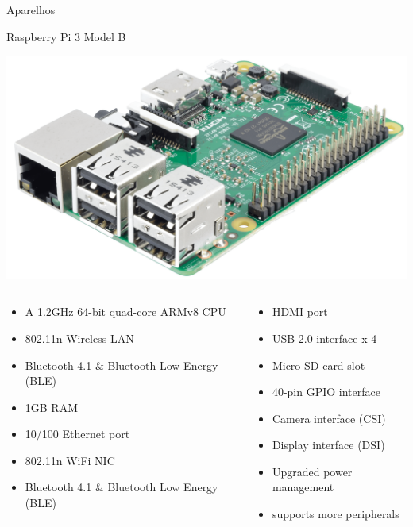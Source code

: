 \documentclass{beamer}
\begin{document}
\begin{frame}{Aparelhos}

\begin{exampleblock}{}
   \begin{center}
    Raspberry Pi 3 Model B    
   \end{center}
\end{exampleblock}   
\begin{center}
\includegraphics[width=.56\textwidth]{img/slide_rasp1.png}   
\end{center}

\begin{columns}
\begin{column}{0.56\textwidth}
\begin{itemize}\tiny
 \item A 1.2GHz 64-bit quad-core ARMv8 CPU
 \item 802.11n Wireless LAN
 \item Bluetooth 4.1 \& Bluetooth Low Energy (BLE)
 \item 1GB RAM
 \item 10/100 Ethernet port
 \item 802.11n WiFi NIC
 \item Bluetooth 4.1 \& Bluetooth Low Energy (BLE)
\end{itemize}
\end{column}
\begin{column}{0.44\textwidth}
\begin{itemize}\tiny
 \item HDMI port
 \item USB 2.0 interface x 4
 \item Micro SD card slot
 \item 40-pin GPIO interface
 \item Camera interface (CSI)
 \item Display interface (DSI)
 \item Upgraded power management
 \item supports more peripherals  
 \end{itemize}
\end{column}
\end{columns}

\end{frame}
\end{document}
